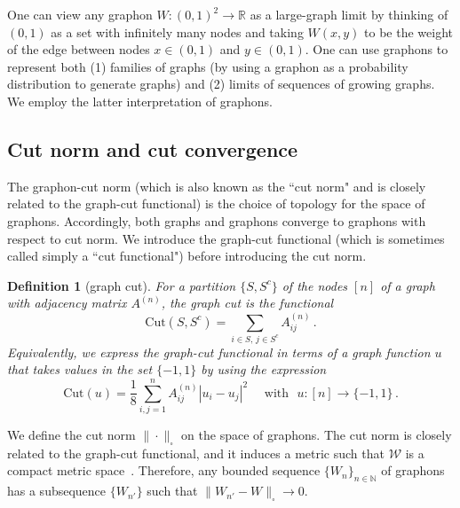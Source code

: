 \documentclass[11pt]{amsart}
\newtheorem{definition}{Definition}[section]
\def\R{\mathbb{R}}
\def\N{\mathbb{N}}
\def\ra{\rightarrow}
\numberwithin{equation}{section}
\begin{document}
One can view any graphon $W: (0,1)^2 \ra \R$ as a large-graph limit by thinking of $(0,1)$ as a set with infinitely many nodes and taking $W(x,y)$ to be the weight of the edge between nodes $x \in (0,1)$ and $y \in (0,1)$. One can use graphons to represent both (1) families of graphs (by using a graphon as a probability distribution to generate graphs) and (2) limits of sequences of growing graphs. We employ the latter interpretation of graphons. 




\subsection{Cut norm and cut convergence}

The {graphon-cut} norm (which is also known as the ``cut norm" and is closely related to the graph-cut functional) is the choice of topology for the space of graphons. {Accordingly,} both graphs and graphons converge to graphons with respect to cut norm. We introduce the graph-cut functional (which is sometimes called simply a ``cut functional") before introducing the cut norm. 

\begin{definition}[{graph cut}]
    For a partition $\{S, S^c\}$ of the nodes $[n]$ of a graph with adjacency matrix $A^{(n)}$, the {graph cut} is the functional
    \begin{equation}
        \mathrm{Cut}(S, S^c) = \sum_{i \in S, \, j \in S^c} A^{(n)}_{ij}  \,. 
    \end{equation}
    Equivalently, we express the graph-cut functional in terms of a graph function $u$ that takes values in the set $\{-1,1\}$ {by} using the expression 
    \begin{equation}\label{eq: graph-cut dirichlet form}
        \mathrm{Cut}(u) = {\frac{1}{8}} \sum_{i, j = 1}^n A^{(n)}_{ij} |u_i - u_j|^2 \quad \text{ with }\,\, u: [n] \ra \{-1,1\} \,.
    \end{equation}
\end{definition}



We define the cut norm $\|\cdot\|_\square$ on the space of graphons. The cut norm is closely related to the graph-cut functional, and it induces a metric such that $\mathcal{W}$ is a compact metric space~\cite{lovasz2007szemeredi}. Therefore, any bounded sequence $\{W_n\}_{n\in \N}$ of graphons has a subsequence {$\{W_{n'}\}$} such that $\|W_{n'} - W\|_\square \ra 0$. 
\end{document}
